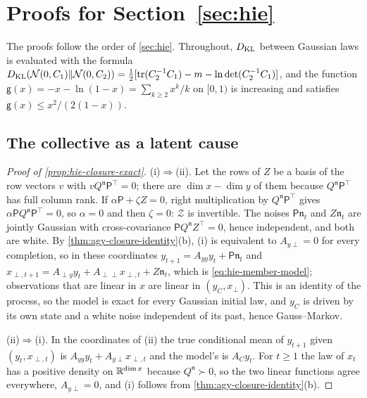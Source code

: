 \section{Proofs for \texorpdfstring{Section~\ref{sec:hie}}{hierarchy}}\label{app:hie}

The proofs follow the order of \cref{sec:hie}. Throughout, $D_{\mathrm{KL}}$ between Gaussian laws is evaluated with the formula $D_{\mathrm{KL}}(\mathcal{N}(0,C_1)\Vert\mathcal{N}(0,C_2))=\frac12[\operatorname{tr}(C_2^{-1}C_1)-m-\ln\det(C_2^{-1}C_1)]$, and the function $\mathsf g(x)=-x-\ln(1-x)=\sum_{k\ge2}x^k/k$ on $[0,1)$ is increasing and satisfies $\mathsf g(x)\le x^2/(2(1-x))$.

\subsection*{The collective as a latent cause}

\begin{proof}[Proof of \cref{prop:hie-closure-exact}]
(i)$\Rightarrow$(ii). Let the rows of $Z$ be a basis of the row vectors $v$ with $vQ^{\mathfrak n}\mathsf P^\top=0$; there are $\dim x-\dim y$ of them because $Q^{\mathfrak n}\mathsf P^\top$ has full column rank. If $\alpha\mathsf P+\zeta Z=0$, right multiplication by $Q^{\mathfrak n}\mathsf P^\top$ gives $\alpha\mathsf PQ^{\mathfrak n}\mathsf P^\top=0$, so $\alpha=0$ and then $\zeta=0$: $\mathcal Z$ is invertible. The noises $\mathsf P\mathfrak n_t$ and $Z\mathfrak n_t$ are jointly Gaussian with cross-covariance $\mathsf PQ^{\mathfrak n}Z^\top=0$, hence independent, and both are white. By \cref{thm:agy-closure-identity}(b), (i) is equivalent to $A_{y\perp}=0$ for every completion, so in these coordinates $y_{t+1}=A_{yy}y_t+\mathsf P\mathfrak n_t$ and $x_{\perp,t+1}=A_{\perp y}y_t+A_{\perp\perp}x_{\perp,t}+Z\mathfrak n_t$, which is \eqref{eq:hie-member-model}; observations that are linear in $x$ are linear in $(y_C,x_\perp)$. This is an identity of the process, so the model is exact for every Gaussian initial law, and $y_C$ is driven by its own state and a white noise independent of its past, hence Gauss--Markov.

(ii)$\Rightarrow$(i). In the coordinates of (ii) the true conditional mean of $y_{t+1}$ given $(y_t,x_{\perp,t})$ is $A_{yy}y_t+A_{y\perp}x_{\perp,t}$ and the model's is $A_Cy_t$. For $t\ge1$ the law of $x_t$ has a positive density on $\mathbb{R}^{\dim x}$ because $Q^{\mathfrak n}\succ0$, so the two linear functions agree everywhere, $A_{y\perp}=0$, and (i) follows from \cref{thm:agy-closure-identity}(b).
\end{proof}

